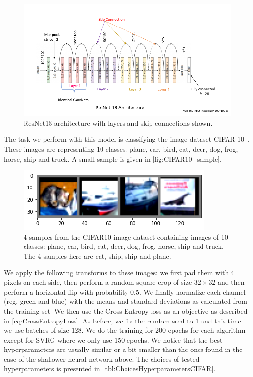 \documentclass[a4paper,11pt,oneside]{report}
\begin{document}
\begin{figure}
    \centering
    \includegraphics[scale=0.35]{midterm presentation/images/ResNet18.png}
    \caption{ResNet18 architecture with layers and skip connections shown.}
    \label{fig:resnet18}
\end{figure}

The task we perform with this model is classifying the image dataset CIFAR-10~\cite{Krizhevsky09learningmultiple}. These images are representing 10 classes: plane, car, bird, cat, deer, dog, frog, horse, ship and truck. A small sample is given in \autoref{fig:CIFAR10_sample}.

\begin{figure}
    \centering
    \includegraphics{figures/CIFAR10_sample.png}
    \caption{4 samples from the CIFAR10 image dataset containing images of 10 classes: plane, car, bird, cat, deer, dog, frog, horse, ship and truck. The 4 samples here are cat, ship, ship and plane.}
    \label{fig:CIFAR10_sample}
\end{figure}

We apply the following transforms to these images: we first pad them with 4 pixels on each side, then perform a random square crop of size $32\times32$ and then perform a horizontal flip with probability $0.5$. We finally normalize each channel (reg, green and blue) with the means and standard deviations as calculated from the training set. We then use the Cross-Entropy loss as an objective as described in \autoref{eq:CrossEntropyLoss}. As before, we fix the random seed to 1 and this time we use batches of size 128. We do the training for 200 epochs for each algorithm except for SVRG where we only use 150 epochs. We notice that the best hyperparameters are usually similar or a bit smaller than the ones found in the case of the shallower neural network above. The choices of tested hyperparameters is presented in~\autoref{tbl:ChoicesHyperparametersCIFAR}.
\end{document}

